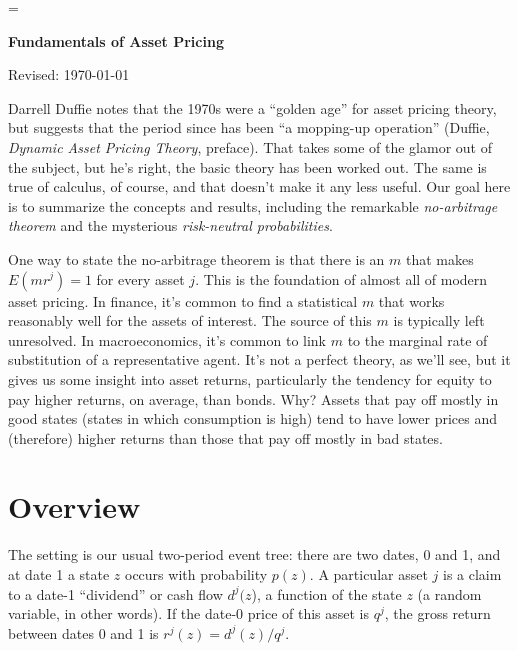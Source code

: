 \documentclass[11pt]{article}
\begin{document}
\parskip=\bigskipamount
\parindent=0.0in
\thispagestyle{empty}


\bigskip\bigskip
\centerline{\Large \bf Fundamentals of Asset Pricing}
\centerline{Revised: \today}

\begin{comment}
*** work in digression:  change of measure and Girsanov formula ***
\url{http://www.math.nyu.edu/faculty/goodman/teaching/StochCalc2012/notes/Week10.pdf}

*** also mention CAPM \\
Check Duffie re projections...
\end{comment}

\bigskip
Darrell Duffie notes that the 1970s were a ``golden age''
for asset pricing theory,
but suggests that the period since has been ``a mopping-up operation''
(Duffie, {\it Dynamic Asset Pricing Theory\/}, preface).
That takes some of the glamor out of the subject,
but he's right, the basic theory has been worked out.
The same is true of calculus, of course,
and that doesn't make it any less useful.
Our goal here is to summarize the concepts and results,
including the remarkable {\it no-arbitrage theorem\/} and
the mysterious {\it risk-neutral probabilities\/}.

One way to state the no-arbitrage theorem is that there is an $m$ that makes
$E(mr^j) = 1$ for every asset $j$.
This is the foundation of almost all of modern asset pricing.
In finance, it's common to find a statistical $m$ that works reasonably well
for the assets of interest.
The source of this $m$ is typically left unresolved.
In macroeconomics, it's common to link $m$ to the marginal rate of substitution
of a representative agent.
It's not a perfect theory, as we'll see, but it gives us some insight into asset returns,
particularly the tendency for equity to pay higher returns, on average,
than bonds.
Why?
Assets that pay off mostly in good states (states in which consumption is high)
tend to have lower prices and (therefore) higher returns than those that pay off mostly in bad states.



\section{Overview}

The setting is our usual two-period event tree:
there are two dates, 0 and 1,
and at date 1 a state $z$ occurs with probability $p(z)$.
A particular asset $j$ is a claim to a date-1 ``dividend'' or cash flow $d^j(z$),
a function of the state $z$ (a random variable, in other words).
If the date-0 price of this asset is $q^j$,
the gross return between dates 0 and 1 is $r^j(z) = d^j(z) / q^j$.
\end{document}

